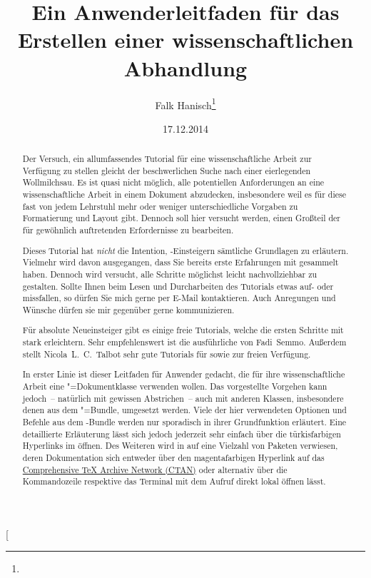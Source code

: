 \documentclass[%
  english,ngerman,%
  cdgeometry=no,DIV=12,automark,%
]{tudscrartcl}
\begin{document}
\date{17.12.2014}
\author{Falk Hanisch\thanks{\noexpand\scriptsize\noexpand\Email{\tudscrmail}}}
\title{%
  Ein Anwenderleitfaden für das Erstellen einer wissenschaftlichen Abhandlung%
}
\makeatletter
\begingroup%
  \def\and{, }%
  \let\thanks\@gobble%
  \let\footnote\@gobble%
\endgroup%
\makeatother
\StartTutorial[%
  \begin{abstract}\noindent
  Der Versuch, ein allumfassendes Tutorial für eine wissenschaftliche Arbeit 
  zur Verfügung zu stellen gleicht der beschwerlichen Suche nach einer 
  eierlegenden Wollmilchsau. Es ist quasi nicht möglich, alle potentiellen 
  Anforderungen an eine wissenschaftliche Arbeit in einem Dokument abzudecken, 
  insbesondere weil es für diese fast von jedem Lehrstuhl mehr oder weniger 
  unterschiedliche Vorgaben zu Formatierung und Layout gibt. Dennoch soll hier 
  versucht werden, einen Großteil der für gewöhnlich auftretenden Erfordernisse 
  zu bearbeiten.
  
  Dieses Tutorial hat \emph{nicht} die Intention, -Einsteigern 
  sämtliche Grundlagen zu erläutern. Vielmehr wird davon ausgegangen, dass Sie 
  bereits erste Erfahrungen mit  gesammelt haben. Dennoch wird 
  versucht, alle Schritte möglichst leicht nachvollziehbar zu gestalten. Sollte 
  Ihnen beim Lesen und Durcharbeiten des Tutorials etwas auf- oder missfallen, 
  so dürfen Sie mich gerne per E-Mail kontaktieren. Auch Anregungen und Wünsche 
  dürfen sie mir gegenüber gerne kommunizieren.
  
  Für absolute Neueinsteiger gibt es einige freie Tutorials, welche die ersten 
  Schritte mit  stark erleichtern. Sehr empfehlenswert ist die 
  ausführliche  
  von Fadi~Semmo. Außerdem stellt Nicola~L.~C.~Talbot sehr gute Tutorials für 
  \cite{talbot2012} sowie 
  \cite{talbot2013} zur freien Verfügung.
  
  In erster Linie ist dieser Leitfaden für Anwender gedacht, die für ihre
  wissenschaftliche Arbeit eine \TUDScript"=Dokumentklasse verwenden wollen. 
  Das vorgestellte Vorgehen kann jedoch~-- natürlich mit gewissen Abstrichen~-- 
  auch mit anderen Klassen, insbesondere denen aus dem \KOMAScript"=Bundle, 
  umgesetzt werden. Viele der hier verwendeten Optionen und Befehle aus dem 
  \TUDScript-Bundle werden nur sporadisch in ihrer Grundfunktion erläutert. 
  Eine detaillierte Erläuterung lässt sich jedoch jederzeit sehr einfach über 
  die türkisfarbigen Hyperlinks im  öffnen. 
  Des Weiteren wird in auf eine Vielzahl von Paketen verwiesen, deren 
  Dokumentation sich entweder über den magentafarbigen Hyperlink auf das 
  \href{http://www.ctan.org/}{Comprehensive TeX Archive Network (CTAN)} oder 
  alternativ über die Kommandozeile respektive das Terminal mit dem Aufruf 
   direkt lokal öffnen lässt.
  

\end{abstract}
\end{document}
